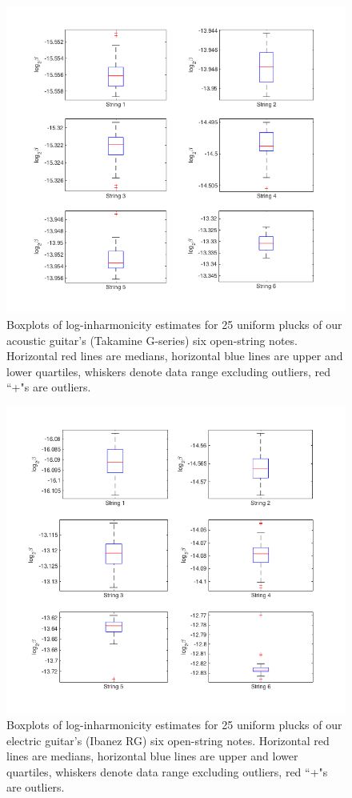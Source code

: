 \documentclass[12pt]{cmuthesis}
\begin{document}
\begin{figure}[!htbp] 
\centering
\includegraphics[scale=0.65]{ag-meas-var}
\caption{Boxplots of log-inharmonicity estimates for 25 uniform plucks of our acoustic guitar's (Takamine G-series) six open-string notes. Horizontal red lines are medians, horizontal blue lines are upper and lower quartiles, whiskers denote data range excluding outliers, red ``+"s are outliers.}
\label{fig:ag-meas-var}
\end{figure}

\begin{figure}[!htbp] 
\centering
\includegraphics[scale=0.65]{eg-meas-var}
\caption{Boxplots of log-inharmonicity estimates for 25 uniform plucks of our electric guitar's (Ibanez RG) six open-string notes. Horizontal red lines are medians, horizontal blue lines are upper and lower quartiles, whiskers denote data range excluding outliers, red ``+"s are outliers.}
\label{fig:eg-meas-var}
\end{figure}
\end{document}
